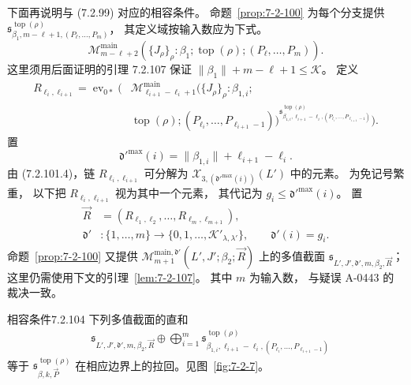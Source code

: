下面再说明与 (7.2.99) 对应的相容条件。
命题~\ref{prop:7-2-100}
为每个分支提供
$\mathfrak s^{\operatorname{top}(\rho)}_{\beta_1,
m-\ell+1,(P_\ell,\ldots,P_m)}$，
其定义域按输入数应为下式。%
\begin{equation}
\mathcal M^{\mathrm{main}}_{m-\ell+2}
(\{J_\rho\}_\rho:\beta_1;
\operatorname{top}(\rho);
(P_\ell,\ldots,P_m)).
\tag{7.2.103.1}\label{eq:7-2-103-1}
\end{equation}
这里须用后面证明的引理 7.2.107
保证 $\|\beta_1\|+m-\ell+1\le\mathcal K$。
定义
\begin{equation}
\begin{aligned}
R_{\ell_i,\ell_{i+1}}
=\operatorname{ev}_{0*}\bigl(&
\mathcal M^{\mathrm{main}}_{\ell_{i+1}-\ell_i+1}
(\{J_\rho\}_\rho:\beta_{1,i};\\[-2pt]
&\operatorname{top}(\rho);
(P_{\ell_i},\ldots,P_{\ell_{i+1}-1}))
^{\mathfrak s^{\operatorname{top}(\rho)}_{\beta_{1,i},
\ell_{i+1}-\ell_i,(P_{\ell_i},\ldots,
P_{\ell_{i+1}-1})}}
\bigr).
\end{aligned}
\tag{7.2.103.2}\label{eq:7-2-103-2}
\end{equation}
置
\[
\mathfrak d'^{\max}(i)
=\|\beta_{1,i}\|+\ell_{i+1}-\ell_i.
\]
由 (7.2.101.4)，链 $R_{\ell_i,\ell_{i+1}}$
可分解为
$\mathcal X_{3,(\mathfrak d'^{\max}(i))}(L')$
中的元素。
为免记号繁重，
以下把 $R_{\ell_i,\ell_{i+1}}$
视为其中一个元素，
其代记为 $g_i\le\mathfrak d'^{\max}(i)$。
置
\[
\begin{aligned}
\vec R&=(R_{\ell_1,\ell_2},\ldots,
R_{\ell_m,\ell_{m+1}}),\\
\mathfrak d'&\colon\{1,\ldots,m\}
\longrightarrow\{0,1,\ldots,\mathcal K'_{\lambda,\lambda'}\},
\qquad\mathfrak d'(i)=g_i.
\end{aligned}
\]
命题~\ref{prop:7-2-100} 又提供
$\mathcal M^{\mathrm{main},\mathfrak d'}_{m+1}
(L',J';\beta_2;\vec R)$
上的多值截面
$\mathfrak s_{L',J',\mathfrak d',m,\beta_2,\vec R}$；
这里仍需使用下文的引理~\ref{lem:7-2-107}。
其中 $m$ 为输入数，
与疑误 A-0443 的裁决一致。

\begin{statement}{相容条件}{7.2.104}
\label{cond:7-2-104}
下列多值截面的直和
\[
\begin{aligned}
&\mathfrak s_{L',J',\mathfrak d',m,\beta_2,\vec R}
\oplus\bigoplus_{i=1}^{m}
\mathfrak s^{\operatorname{top}(\rho)}_{\beta_{1,i},
\ell_{i+1}-\ell_i,
(P_{\ell_i},\ldots,P_{\ell_{i+1}-1})}
\end{aligned}
\]
等于
$\mathfrak s^{\operatorname{top}(\rho)}_{\beta,k,\vec P}$
在相应边界上的拉回。见图~\ref{fig:7-2-7}。
\end{statement}

